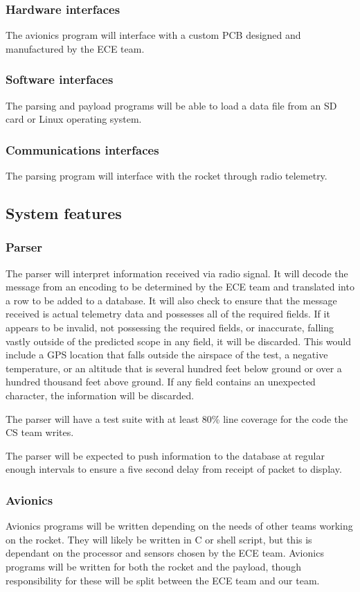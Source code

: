 \documentclass[onecolumn, draftclsnofoot, 10pt, compsoc]{IEEEtran}
\begin{document}
\subsubsection{Hardware interfaces}
The avionics program will interface with a custom PCB designed and manufactured by the ECE team.
	
\subsubsection{Software interfaces}
The parsing and payload programs will be able to load a data file from an SD card or Linux operating system.

\subsubsection{Communications interfaces}
The parsing program will interface with the rocket through radio telemetry.

\subsection{System features}

\subsubsection{Parser}
The parser will interpret information received via radio signal. It will decode the message from an encoding to be determined by the ECE team and translated into a row to be added to a database. It will also check to ensure that the message received is actual telemetry data and possesses all of the required fields. If it appears to be invalid, not possessing the required fields, or inaccurate, falling vastly outside of the predicted scope in any field, it will be discarded. This would include a GPS location that falls outside the airspace of the test, a negative temperature, or an altitude that is several hundred feet below ground or over a hundred thousand feet above ground. If any field contains an unexpected character, the information will be discarded.

The parser will have a test suite with at least 80\% line coverage for the code the CS team writes.

The parser will be expected to push information to the database at regular enough intervals to ensure a five second delay from receipt of packet to display.

\subsubsection{Avionics}
Avionics programs will be written depending on the needs of other teams working on the rocket. They will likely be written in C or shell script, but this is dependant on the processor and sensors chosen by the ECE team. Avionics programs will be written for both the rocket and the payload, though responsibility for these will be split between the ECE team and our team.
\end{document}
